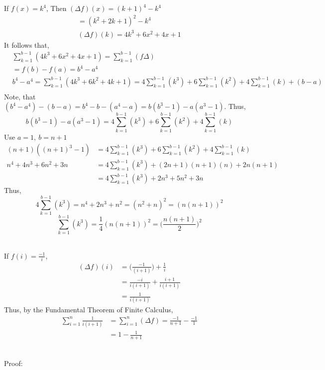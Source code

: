 \documentclass[letterpaper,12pt]{article}
\theoremstyle{definition}
\begin{document}
If $f(x) = k^4 $, Then $(\Delta f)(x) = (k+1)^4 - k^4$
\begin{align*}
    = (k^2 +2k +1)^2 - k^4 \\
    (\Delta f)(k) = 4k^3 + 6x^2 + 4x +1
\end{align*}
It follows that, 
\begin{align*}
    &\sum_{k=1}^{b-1}(4k^3 + 6x^2+4x+1)  = \sum_{k=1}^{b-1}(f\Delta) \\
    & = f(b) - f(a) = b^4 - a^4\\
    & b^4 - a^4  = \sum_{k=1}^{b-1}(4k^3 + 6k^2 +4k +1) = 4\sum_{k=1}^{b-1}(k^3) + 6\sum_{k=1}^{b-1}(k^2) + 4\sum_{k=1}^{b-1}(k) + (b-a)\\
\end{align*}
Note, that $ (b^4-a^4) - (b-a) = b^4 - b - (a^4-a) = b(b^3 -1) - a(a^3-1)$. Thus, 
\[
    b(b^3-1) - a(a^3 -1) = 4\sum_{k=1}^{b-1}(k^3) + 6\sum_{k=1}^{b-1}(k^2) + 4\sum_{k=1}^{b-1}(k)
\]
Use $a =1,~b=n+1$
\begin{align*}
    (n+1)( (n+1)^3-1) &= 4\sum_{k=1}^{b-1}(k^3) + 6\sum_{k=1}^{b-1}(k^2) + 4\sum_{k=1}^{b-1}(k) \\
    n^4 + 4n^3 + 6n^2 + 3n & = 4\sum_{k=1}^{b-1}(k^3) + (2n+1)(n+1)(n) + 2n(n+1) \\
    & = 4\sum_{k=1}^{b-1}(k^3) + 2n^3 + 5n^2 + 3n
\end{align*}
Thus, 
\[
    4\sum_{k=1}^{b-1}(k^3) = n^4 + 2n^3 + n^2 = (n^2 + n)^2 = (n(n+1))^2
\]
\[
    \sum_{k=1}^{b-1}(k^3) = \frac{1}{4}(n(n+1))^2 = \Big(\frac{n(n+1)}{2}\Big)^2
\]

\\
If $f(i) = \frac{-1}{i}$, 
\begin{align*}
    (\Delta f)(i) & = \Big(\frac{-1}{(i+1)}\Big) + \frac{1}{i} \\
    & = \frac{-i}{i(i+1)} + \frac{i+1}{i(i+1)} \\
    & = \frac{1}{i(i+1)}
\end{align*}
Thus, by the Fundamental Theorem of Finite Calculus, 
\begin{align*}
    \sum^n_{i=1} \frac{1}{i(i+1)} & = \sum^n_{i=1} (\Delta f) = \frac{-1}{n+1} - \frac{-1}{1} \\
    & = 1 - \frac{1}{n+1}
\end{align*}

\\
Proof:\\
\end{document}
